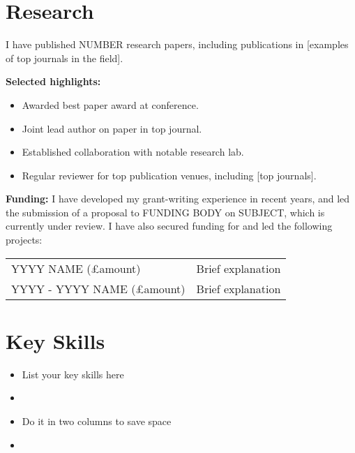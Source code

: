 \documentclass[a4paper,11pt,oneside]{article}
\begin{document}
    \section*{Research}
    I have published NUMBER research papers, including publications in [examples of top journals in the field].

    \noindent\textbf{Selected highlights:}
    \begin{itemize}
        \item Awarded best paper award at conference.
        \item Joint lead author on paper in top journal.
        \item Established collaboration with notable research lab.
        \item Regular reviewer for top publication venues, including [top journals].
    \end{itemize}

    \noindent\textbf{Funding:}
    I have developed my grant-writing experience in recent years, and led the submission of a proposal to FUNDING BODY on SUBJECT, which is currently under review.
    I have also secured funding for and led the following projects:
    \begin{tabularx}{\textwidth}{p{3.2cm}X}
        YYYY\newline
        NAME (£amount) & Brief explanation\\
        YYYY - YYYY\newline
        NAME (£amount) & Brief explanation\\
    \end{tabularx}

    \section*{Key Skills}
    \begin{minipage}{0.5\textwidth}
        \begin{itemize}
            \item List your key skills here
            \item
        \end{itemize}
    \end{minipage}
    \begin{minipage}{0.5\textwidth}
        \begin{itemize}
            \item Do it in two columns to save space
            \item
        \end{itemize}
    \end{minipage}
\end{document}

